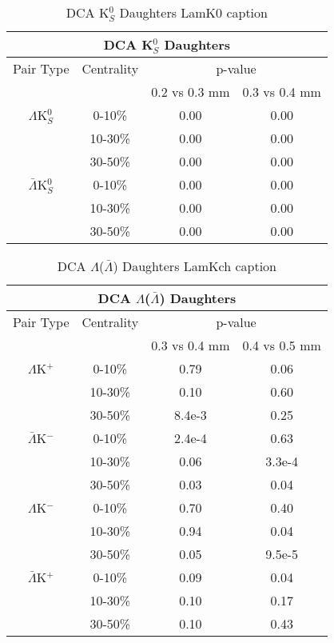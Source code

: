 \begin{table}
 \centering
 \begin{tabular}{|c|c|c|c|}
 \multicolumn{4}{c}{DCA K$^{0}_{S}$ Daughters} \\
  \hline
  Pair Type & Centrality & \multicolumn{2}{c|}{p-value} \\
  \cline{3-4}
   & & 0.2 vs 0.3 mm & 0.3 vs 0.4 mm \\
  \hline
  $\Lambda$K$^{0}_{S}$ & 0-10\% & 0.00 & 0.00 \\
   & 10-30\% & 0.00 & 0.00 \\
   & 30-50\% & 0.00 &0.00 \\
  \hline
  $\bar{\Lambda}$K$^{0}_{S}$ & 0-10\% & 0.00 & 0.00 \\
   & 10-30\% & 0.00 & 0.00 \\
   & 30-50\% & 0.00 & 0.00 \\
  \hline
 \end{tabular}
 \caption{DCA K$^{0}_{S}$ Daughters LamK0 caption}
 \label{tab:K0DaughtersDcaLamK0}
\end{table}

\begin{table}
 \centering
 \begin{tabular}{|c|c|c|c|}
 \multicolumn{4}{c}{DCA $\Lambda$($\bar{\Lambda}$) Daughters} \\
  \hline
  Pair Type & Centrality & \multicolumn{2}{c|}{p-value} \\
  \cline{3-4}
   & & 0.3 vs 0.4 mm & 0.4 vs 0.5 mm \\
  \hline
  $\Lambda$K$^{+}$ & 0-10\% & 0.79 & 0.06 \\
   & 10-30\% & 0.10 & 0.60 \\
   & 30-50\% & 8.4e-3 & 0.25 \\
  \hline
  $\bar{\Lambda}$K$^{-}$ & 0-10\% & 2.4e-4 & 0.63 \\
   & 10-30\% & 0.06 & 3.3e-4 \\
   & 30-50\% & 0.03 & 0.04 \\
  \hline \hline
  $\Lambda$K$^{-}$ & 0-10\% & 0.70 & 0.40 \\
   & 10-30\% & 0.94 & 0.04 \\
   & 30-50\% & 0.05 & 9.5e-5 \\
  \hline
  $\bar{\Lambda}$K$^{+}$ & 0-10\% & 0.09 & 0.04 \\
   & 10-30\% & 0.10 & 0.17 \\
   & 30-50\% & 0.10 & 0.43 \\
  \hline
 \end{tabular}
 \caption{DCA $\Lambda$($\bar{\Lambda}$) Daughters LamKch caption}
 \label{tab:LamDaughtersDcaLamKch}
\end{table}